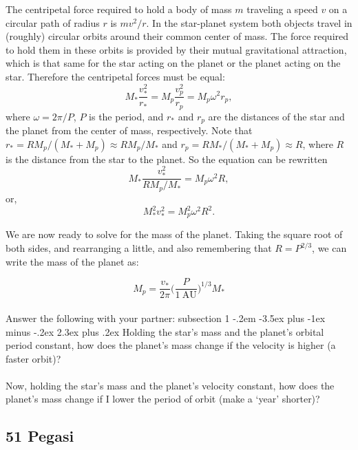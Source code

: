 \documentclass[12pt]{article}
\makeatletter
\newenvironment{problem}{\@startsection
       {subsection}
       {1}
       {-.2em}
       {-3.5ex plus -1ex minus -.2ex}
       {2.3ex plus .2ex}
       {\pagebreak[3]%
       \normalsize\bf\noindent{Problem }
       }
       }
       {%
       }
\makeatother
\begin{document}
The centripetal force required to hold a body of mass $m$ traveling
a speed $v$ on a circular path of radius $r$ is $m v^2 / r$. In the
star-planet system both objects travel in (roughly) circular orbits
around their common center of mass. The force required to hold them in
these orbits is provided by their mutual gravitational attraction,
which is that same for the star acting on the planet or the planet
acting on the star. Therefore the centripetal forces must be equal:
\begin{equation}
M_* \frac{v_*^2}{r_*} = M_p \frac{v_p^2}{r_p} = M_p \omega^2 r_p,
\end{equation}
where $\omega = 2 \pi / P$, $P$ is the period, and $r_*$ and $r_p$ are
the distances of the star and the planet from the center of mass,
respectively. Note that $r_* = R M_p/(M_* + M_p) \approx R M_p/M_*$
and $r_p = R M_*/(M_* + M_p) \approx R$, where $R$ is the distance
from the star to the planet.  So the equation can be rewritten
\begin{equation}
M_* \frac{v_*^2}{R M_p / M_*} = M_p \omega^2 R,
\end{equation}
or,
\begin{equation}
M_*^2 v_*^2 = M_p^2 \omega^2 R^2.
\end{equation}

We are now ready to solve for the mass of the planet. Taking the
square root of both sides, and rearranging a little, and also remembering
that $R = P^{2/3}$, we can write the mass of the planet as:

\begin{equation}
M_p = \frac{v_*}{2\pi} \Big(\frac{P}{1~\mathrm{AU}}\Big)^{1/3} M_*
\end{equation}

\paragraph{}
Answer the following with your partner: 
\begin{problem}{ }
	Holding the star's mass and the planet's orbital period constant, how does the planet's mass change
	if the velocity is higher (a faster orbit)? \\
	\\
	Now, holding the star's mass and the planet's velocity constant, how does the planet's mass change 
	if I lower the period of orbit (make a `year' shorter)?
\end{problem}

\subsection{51 Pegasi}
\end{document}
